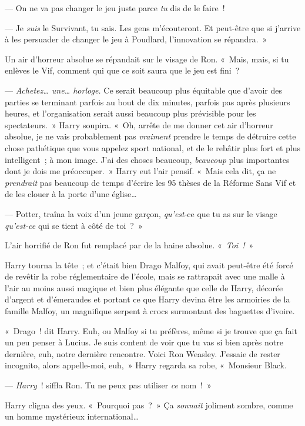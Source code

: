 --- On ne va pas changer le jeu juste parce \emph{tu} dis de le faire~!

--- Je \emph{suis} le Survivant, tu sais. Les gens m'écouteront. Et peut-être que si j'arrive à les persuader de changer le jeu à Poudlard, l'innovation se répandra.~»

Un air d'horreur absolue se répandait sur le visage de Ron.
«~Mais, mais, si tu enlèves le Vif, comment qui que ce soit saura que le jeu est fini~?

--- \emph{Achetez… une… horloge.} Ce serait beaucoup plus équitable que d'avoir des parties se terminant parfois au bout de dix minutes, parfois pas après plusieurs heures, et l'organisation serait aussi beaucoup plus prévisible pour les spectateurs.~» Harry soupira. «~Oh, arrête de me donner cet air d'horreur absolue, je ne vais probablement pas \emph{vraiment} prendre le temps de détruire cette chose pathétique que vous appelez sport national, et de le rebâtir plus fort et plus intelligent~; à mon image. J'ai des choses beaucoup, \emph{beaucoup} plus importantes dont je dois me préoccuper.~» Harry eut l'air pensif. «~Mais cela dit, ça ne \emph{prendrait} pas beaucoup de temps d'écrire les 95 thèses de la Réforme Sans Vif et de les clouer à la porte d'une église…

--- Potter, traîna la voix d'un jeune garçon, \emph{qu'est}-ce que tu as sur le visage \emph{qu'est-ce} qui se tient à côté de toi~?~»

L'air horrifié de Ron fut remplacé par de la haine absolue. «~\emph{Toi~!}~»

Harry tourna la tête~; et c'était bien Drago Malfoy, qui avait peut-être été forcé de revêtir la robe réglementaire de l'école, mais se rattrapait avec une malle à l'air au moins aussi magique et bien plus élégante que celle de Harry, décorée d'argent et d'émeraudes et portant ce que Harry devina être les armoiries de la famille Malfoy, un magnifique serpent à crocs surmontant des baguettes d'ivoire.

«~Drago~! dit Harry. Euh, ou Malfoy si tu préfères, même si je trouve que ça fait un peu penser à Lucius. Je suis content de voir que tu vas si bien après notre dernière, euh, notre dernière rencontre. Voici Ron Weasley. J'essaie de rester incognito, alors appelle-moi, euh,~» Harry regarda sa robe, «~Monsieur Black.

--- \emph{Harry}~! siffla Ron. Tu ne peux pas utiliser \emph{ce} nom~!~»

Harry cligna des yeux. «~Pourquoi pas~?~» Ça \emph{sonnait} joliment sombre, comme un homme mystérieux international…

